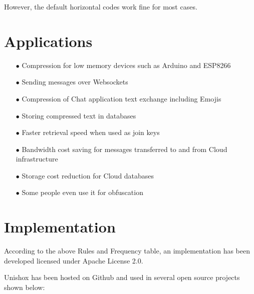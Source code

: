 \documentclass[]{article}
\begin{document}
However, the default horizontal codes work fine for most cases.

\section{Applications}

\begin{itemize}
	\item[$\bullet$] Compression for low memory devices such as Arduino and ESP8266
	\item[$\bullet$] Sending messages over Websockets
	\item[$\bullet$] Compression of Chat application text exchange including Emojis
	\item[$\bullet$] Storing compressed text in databases
	\item[$\bullet$] Faster retrieval speed when used as join keys
	\item[$\bullet$] Bandwidth cost saving for messages transferred to and from Cloud infrastructure
	\item[$\bullet$] Storage cost reduction for Cloud databases
	\item[$\bullet$] Some people even use it for obfuscation
\end{itemize}

\section{Implementation}

According to the above Rules and Frequency table, an implementation has been developed licensed under Apache License 2.0.

Unishox has been hosted on Github and used in several open source projects shown below:
\end{document}
